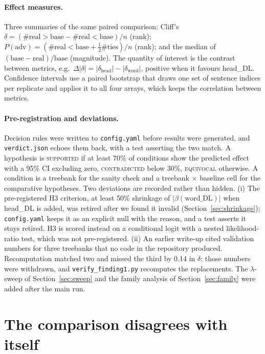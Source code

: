 \documentclass[11pt]{article}
\begin{document}
\paragraph{Effect measures.} Three summaries of the same paired comparison: Cliff's $\delta=(\#\text{real}>\text{base}-\#\text{real}<\text{base})/n$ (rank); $P(\text{adv})=(\#\text{real}<\text{base}+\tfrac12\#\text{ties})/n$ (rank); and the median of $(\text{base}-\text{real})/\text{base}$ (magnitude). The quantity of interest is the contrast between metrics, e.g.\ $\Delta|\delta| = |\delta_{\text{head}}|-|\delta_{\text{word}}|$, positive when it favours head\_DL. Confidence intervals use a paired bootstrap that draws one set of sentence indices per replicate and applies it to all four arrays, which keeps the correlation between metrics.

\paragraph{Pre-registration and deviations.} Decision rules were written to \texttt{config.yaml} before results were generated, and \texttt{verdict.json} echoes them back, with a test asserting the two match. A hypothesis is \textsc{supported} if at least 70\% of conditions show the predicted effect with a 95\% CI excluding zero, \textsc{contradicted} below 30\%, \textsc{equivocal} otherwise. A condition is a treebank for the sanity check and a treebank $\times$ baseline cell for the comparative hypotheses. Two deviations are recorded rather than hidden. (i) The pre-registered H3 criterion, at least 50\% shrinkage of $|\beta(\text{word\_DL})|$ when head\_DL is added, was retired after we found it invalid (Section~\ref{sec:shrinkage}); \texttt{config.yaml} keeps it as an explicit null with the reason, and a test asserts it stays retired. H3 is scored instead on a conditional logit with a nested likelihood-ratio test, which was not pre-registered. (ii) An earlier write-up cited validation numbers for three treebanks that no code in the repository produced. Recomputation matched two and missed the third by 0.14 in $\delta$; those numbers were withdrawn, and \texttt{verify\_finding1.py} recomputes the replacements. The $\lambda$-sweep of Section~\ref{sec:sweep} and the family analysis of Section~\ref{sec:family} were added after the main run.

\section{The comparison disagrees with itself}
\label{sec:h2}
\end{document}
